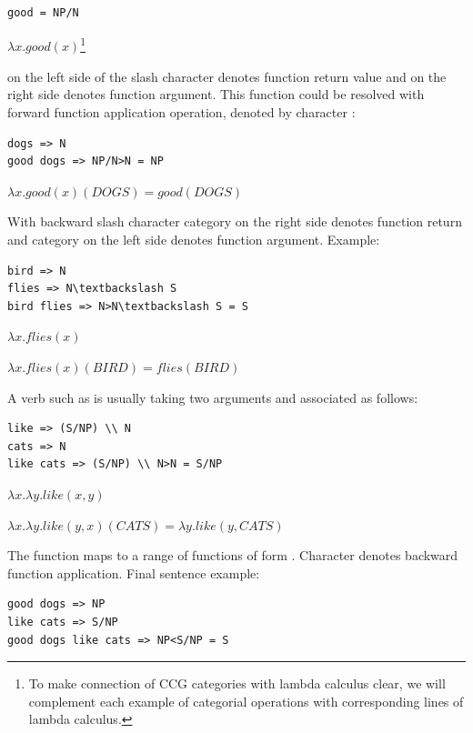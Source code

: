 \begin{verbatim}
good = NP/N 
\end{verbatim}

$\lambda x.good(x)$\footnote{To make connection of CCG categories with lambda calculus clear, we will complement each example of categorial operations with corresponding lines of lambda calculus.}

 on the left side of the slash character denotes function return value and  on the right side denotes function argument. This function could be resolved with forward function application operation, denoted by character \code{>}:

\begin{verbatim}
dogs => N
good dogs => NP/N>N = NP
\end{verbatim}

$\lambda x.good(x)(DOGS)=good(DOGS)$

With backward slash character \code{\textbackslash} category on the right side denotes function return and category on the left side denotes function argument. Example:

\begin{verbatim}
bird => N
flies => N\textbackslash S
bird flies => N>N\textbackslash S = S
\end{verbatim}

$\lambda x.flies(x)$

$\lambda x.flies(x)(BIRD)=flies(BIRD) $

A verb such as  is usually taking two arguments and associated as follows:

\begin{verbatim}
like => (S/NP) \\ N
cats => N
like cats => (S/NP) \\ N>N = S/NP
\end{verbatim}

$\lambda x.\lambda y.like(x, y)$

$\lambda x.\lambda y.like(y, x)(CATS)=\lambda y.like(y, CATS)$

The function  maps  to a range of functions of form .  Character \code{<} denotes backward function application. Final sentence example:

\begin{verbatim}
good dogs => NP
like cats => S/NP
good dogs like cats => NP<S/NP = S
\end{verbatim}

